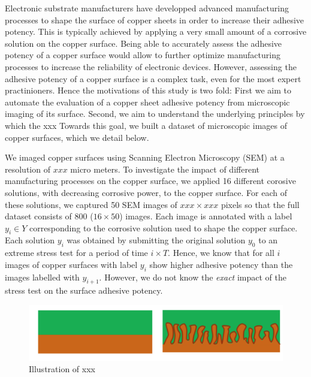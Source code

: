 \documentclass[10pt,twocolumn,letterpaper]{article}
\begin{document}
Electronic substrate manufacturers have developped advanced manufacturing processes to shape the surface of copper sheets in order to increase their adhesive potency. This is typically achieved by applying a very small amount of a corrosive solution on the copper surface.
Being able to accurately assess the adhesive potency of a copper surface would allow to further optimize manufacturing processes to increase the reliability of electronic devices.
However, assessing the adhesive potency of a copper surface is a complex task, even for the most expert practinioners. 
Hence the motivations of this study is two fold: 
First we aim to automate the evaluation of a copper sheet adhesive potency from microscopic imaging of its surface. 
Second, we aim to understand the underlying principles by which the xxx 
Towards this goal, we built a dataset of microscopic images of copper surfaces, which we detail below.

We imaged copper surfaces using Scanning Electron Microscopy (SEM) at a resolution of $xxx$ micro meters.
To investigate the impact of different manufacturing processes on the copper surface, 
we applied 16 different corosive solutions, with decreasing corrosive power, to the copper surface.
For each of these solutions, we captured 50 SEM images of $xxx \times xxx$ pixels so that the full dataset
consists of $800$ ($16 \times 50$) images.
Each image is annotated with a label $y_i \in Y$ corresponding to the corrosive solution used to shape the copper surface.
Each solution $y_i$ was obtained by submitting the original solution $y_0$ to an extreme stress test for a period of time $i \times T$.
Hence, we know that for all $i$ images of copper surfaces with label $y_i$ show higher adhesive potency than the images labelled with $y_{i+1}$.
However, we do not know the \textit{exact} impact of the stress test on the surface adhesive potency.

\begin{figure}[h]
	\centering
	\includegraphics[width=0.9\linewidth]{"./figures/Figure2"}
	\caption{
		Illustration of xxx
	}
\end{figure}
\end{document}
